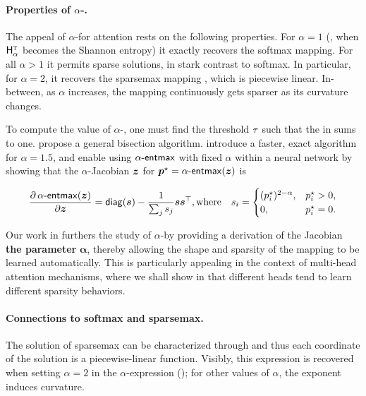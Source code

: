 \paragraph*{Properties of {\boldmath $\alpha$}-\entmaxtext.}
The appeal of $\alpha$-\entmaxtext for attention rests on the
following properties. For $\alpha=1$ (\ie, when $\mathsf{H}^{{\textsc{t}}}_\alpha$ becomes
the Shannon entropy) it exactly recovers the softmax mapping. For all $\alpha>1$
it permits sparse solutions, in stark contrast to softmax. In
particular, for $\alpha=2$, it recovers the sparsemax mapping
\citep{sparsemax}, which is piecewise linear. In-between, as $\alpha$
increases, the mapping continuously gets sparser as its curvature
changes.

To compute the value of $\alpha$-\entmaxtext, one must find the
threshold $\tau$ such that the \rhs in  sums
to one. \citet{blondel2019learning} propose a general bisection
algorithm. \citet{entmax} introduce a faster, exact algorithm for
$\alpha=1.5$, and enable using $\mathop{\mathsf{\alpha}\textnormal{-}\mathsf{entmax}}$ with fixed $\alpha$ within
a neural network by showing that the $\alpha$-\entmaxtext Jacobian
\wrt $\bm{z}$ for $\bm{p}^\star = \mathop{\mathsf{\alpha}\textnormal{-}\mathsf{entmax}}(\bm{z})$ is

\begin{equation}
    \begin{aligned}
        \frac{\partial \mathop{\mathsf{\alpha}\textnormal{-}\mathsf{entmax}}(\bm{z})}{\partial \bm{z}} = \operatorname*{\mathsf{diag}}(\bm{s}) - \frac{1}{\sum_j s_j} \bm{ss}^\top,
        \text{where}\quad s_i = \begin{cases}(p_i^\star)^{2-\alpha}, & p_i^\star > 0, \\
             0,                        & p_i^\star = 0. \\\end{cases}
    \end{aligned}
\end{equation}

Our work in  furthers the study of
$\alpha$-\entmaxtext by providing a derivation of the Jacobian {\bf
        \wrt the parameter} $\boldsymbol{\alpha}$, thereby allowing the shape
and sparsity of the mapping to be learned automatically. This is
particularly appealing in the context of multi-head attention
mechanisms, where we shall show in  that different
heads tend to learn different sparsity behaviors.

\paragraph*{Connections to softmax and sparsemax.}\label{sec:softmax}
The solution of sparsemax can be characterized through 
and thus each coordinate of the solution is a piecewise-linear function.
Visibly, this expression is recovered when setting $\alpha=2$ in the
$\alpha$-\entmaxtext expression (); for other
values of $\alpha$, the exponent induces curvature.

